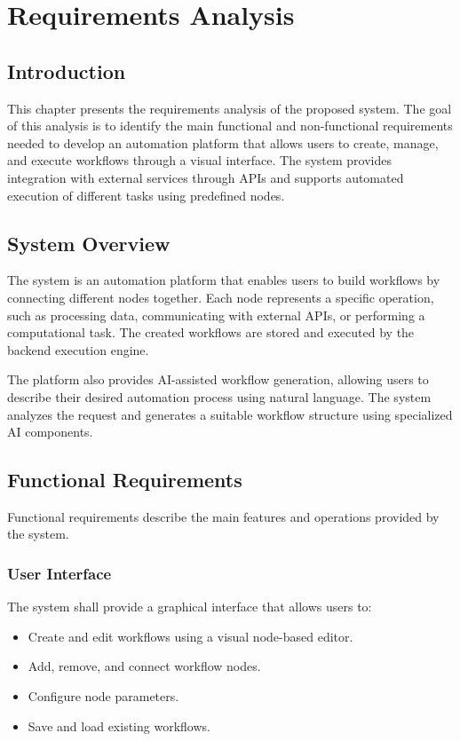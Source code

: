 \chapter{Requirements Analysis}

\section{Introduction}

This chapter presents the requirements analysis of the proposed system. The goal of this analysis is to identify the main functional and non-functional requirements needed to develop an automation platform that allows users to create, manage, and execute workflows through a visual interface. The system provides integration with external services through APIs and supports automated execution of different tasks using predefined nodes.

\section{System Overview}

The system is an automation platform that enables users to build workflows by connecting different nodes together. Each node represents a specific operation, such as processing data, communicating with external APIs, or performing a computational task. The created workflows are stored and executed by the backend execution engine.

The platform also provides AI-assisted workflow generation, allowing users to describe their desired automation process using natural language. The system analyzes the request and generates a suitable workflow structure using specialized AI components.

\section{Functional Requirements}

Functional requirements describe the main features and operations provided by the system.

\subsection{User Interface}

The system shall provide a graphical interface that allows users to:

\begin{itemize}
    \item Create and edit workflows using a visual node-based editor.
    \item Add, remove, and connect workflow nodes.
    \item Configure node parameters.
    \item Save and load existing workflows.
\end{itemize}

